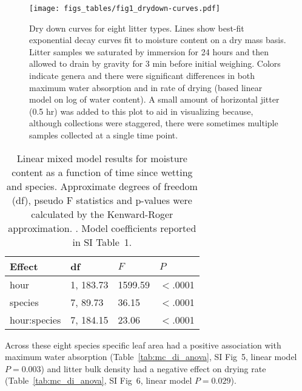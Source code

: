 \documentclass[letterpaper,12pt]{article}
\begin{document}
\begin{figure}[h]
  \centering
\texttt{[image: figs\_tables/fig1\_drydown-curves.pdf]}
\caption{Dry down curves for eight litter types. Lines show best-fit
  exponential decay curves fit to moisture content on a dry mass basis. Litter
  samples we saturated by immersion for 24 hours and then allowed to drain by
  gravity for 3 min before initial weighing. Colors indicate genera and there
  were significant differences in both maximum water absorption and in rate of
  drying (based linear model on log of water content). A small amount of
  horizontal jitter (0.5 hr) was added to this plot to aid in visualizing
  because, although collections were staggered, there were sometimes multiple
  samples collected at a single time point.}
 \label{fig:drydown}
\end{figure}


\begin{table}[h]
  \caption{Linear mixed model results for moisture content as a function of
    time since wetting and species. Approximate degrees of freedom (df), pseudo F
    statistics and p-values were calculated by the Kenward-Roger approximation.
    \citep{Kenward_Roger-1997}. Model coefficients reported in SI Table~1.}
  \label{tab:drydown}
\centering
\begin{tabular}{llll}
  \toprule
Effect & df & $F$ & $P$ \\ 
  \midrule
  hour & 1, 183.73 & 1599.59 & $<$.0001 \\ 
  species & 7, 89.73 & 36.15 & $<$.0001 \\ 
  hour:species & 7, 184.15 & 23.06 & $<$.0001 \\ 
   \bottomrule
\end{tabular}
\end{table}

Across these eight species specific leaf area had a positive association with
maximum water absorption (Table~\ref{tab:mc_di_anova}, SI Fig~5, linear model
$P = 0.003$) and litter bulk density had a negative effect on drying rate
(Table~\ref{tab:mc_di_anova}, SI Fig~6, linear model $P = 0.029$).
\end{document}
